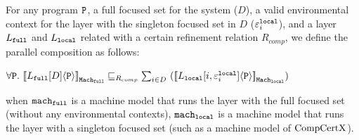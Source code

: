 \begin{definition}
\label{definition:conlink:parallel-composition}
For any program $ {\mathrm{\texttt{P}}}$, a full focused set for the system ($D$), a valid environmental context for the layer with the singleton focused set in $D$ (${\varepsilon}^{{\mathrm{\texttt{local}}}}_{i}$), and a layer $L_{{\mathrm{\texttt{full}}}}$ and $L_{{\mathrm{\texttt{local}}}}$ related with a certain 
refinement relation $R_{comp}$, we define the parallel composition as follows:
\begin{center}
$\forall \codeinmath{P}. \ \semwmachine{L_{\codeinmath{full}}[D]}{\codeinmath{P}}{\machkwd_{\codeinmath{full}}} \refines_{R_{comp}} \sum_{i \in D}\  (\semwmachine{\PLayer{L_{\codeinmath{local}}}{i}{\oracle^{\codeinmath{local}}_i}}{\codeinmath{P}}{\machkwd_{\codeinmath{local}}})$
\end{center}
when  ${\mathrm{\texttt{mach}}}_{{\mathrm{\texttt{full}}}}$ is a machine model that runs the layer with the full focused set (without any environmental contexts),
${\mathrm{\texttt{mach}}}_{{\mathrm{\texttt{local}}}}$ is a machine model that runs the layer with a singleton focused set (such as a machine model of $\mathrm{CompCertX}$).
\end{definition}


